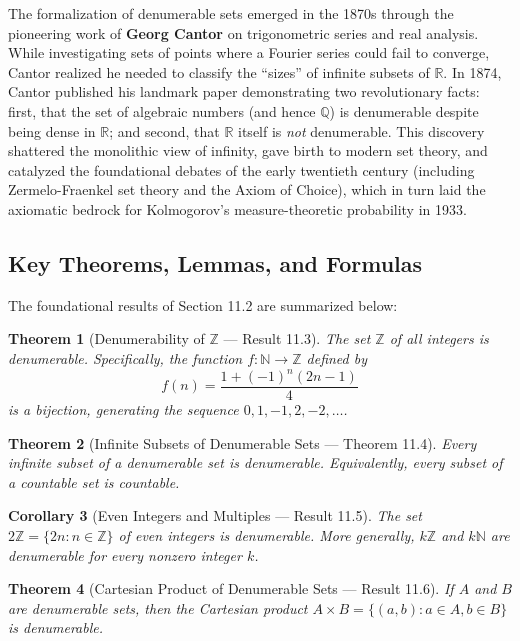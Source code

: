 \documentclass[11pt, letterpaper]{article}
\newtheorem{theorem}{Theorem}[section]
\newtheorem{corollary}[theorem]{Corollary}
\theoremstyle{definition}
\theoremstyle{remark}
\begin{document}
The formalization of denumerable sets emerged in the 1870s through the pioneering work of \textbf{Georg Cantor} on trigonometric series and real analysis. While investigating sets of points where a Fourier series could fail to converge, Cantor realized he needed to classify the ``sizes'' of infinite subsets of $\mathbb{R}$. In 1874, Cantor published his landmark paper demonstrating two revolutionary facts: first, that the set of algebraic numbers (and hence $\mathbb{Q}$) is denumerable despite being dense in $\mathbb{R}$; and second, that $\mathbb{R}$ itself is \textit{not} denumerable. This discovery shattered the monolithic view of infinity, gave birth to modern set theory, and catalyzed the foundational debates of the early twentieth century (including Zermelo-Fraenkel set theory and the Axiom of Choice), which in turn laid the axiomatic bedrock for Kolmogorov's measure-theoretic probability in 1933.

\subsection{Key Theorems, Lemmas, and Formulas}

The foundational results of Section 11.2 are summarized below:

\begin{theorem}[Denumerability of $\mathbb{Z}$ --- Result 11.3]
The set $\mathbb{Z}$ of all integers is denumerable. Specifically, the function $f : \mathbb{N} \to \mathbb{Z}$ defined by
\[
f(n) = \frac{1 + (-1)^n (2n - 1)}{4}
\]
is a bijection, generating the sequence $0, 1, -1, 2, -2, \dots$.
\end{theorem}

\begin{theorem}[Infinite Subsets of Denumerable Sets --- Theorem 11.4]
Every infinite subset of a denumerable set is denumerable. Equivalently, every subset of a countable set is countable.
\end{theorem}

\begin{corollary}[Even Integers and Multiples --- Result 11.5]
The set $2\mathbb{Z} = \{2n : n \in \mathbb{Z}\}$ of even integers is denumerable. More generally, $k\mathbb{Z}$ and $k\mathbb{N}$ are denumerable for every nonzero integer $k$.
\end{corollary}

\begin{theorem}[Cartesian Product of Denumerable Sets --- Result 11.6]
If $A$ and $B$ are denumerable sets, then the Cartesian product $A \times B = \{(a, b) : a \in A, b \in B\}$ is denumerable.
\end{theorem}
\end{document}
